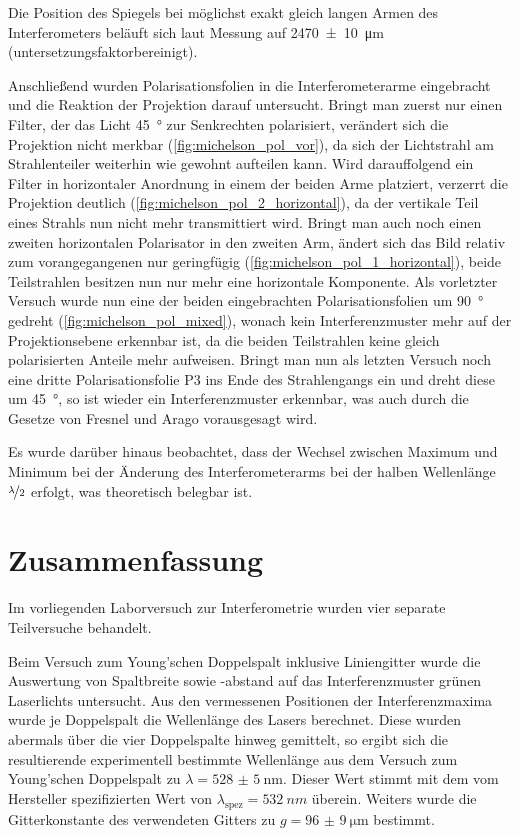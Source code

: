 \documentclass[ngerman]{scrartcl}
\begin{document}
Die Position des Spiegels bei möglichst exakt gleich langen Armen des Interferometers beläuft sich laut Messung auf \SI{2470(10)}{\micro\meter} (untersetzungsfaktorbereinigt).

Anschließend wurden Polarisationsfolien in die Interferometerarme eingebracht und die Reaktion der Projektion darauf untersucht. Bringt man zuerst nur einen Filter, der das Licht \SI{45}{\degree} zur Senkrechten polarisiert, verändert sich die Projektion nicht merkbar (\autoref{fig:michelson_pol_vor}), da sich der Lichtstrahl am Strahlenteiler weiterhin wie gewohnt aufteilen kann. Wird darauffolgend ein Filter in horizontaler Anordnung in einem der beiden Arme platziert, verzerrt die Projektion deutlich (\autoref{fig:michelson_pol_2_horizontal}), da der vertikale Teil eines Strahls nun nicht mehr transmittiert wird. Bringt man auch noch einen zweiten horizontalen Polarisator in den zweiten Arm, ändert sich das Bild relativ zum vorangegangenen nur geringfügig (\autoref{fig:michelson_pol_1_horizontal}), beide Teilstrahlen besitzen nun nur mehr eine horizontale Komponente. Als vorletzter Versuch wurde nun eine der beiden eingebrachten Polarisationsfolien um \SI{90}{\degree} gedreht (\autoref{fig:michelson_pol_mixed}), wonach kein Interferenzmuster mehr auf der Projektionsebene erkennbar ist, da die beiden Teilstrahlen keine gleich polarisierten Anteile mehr aufweisen. Bringt man nun als letzten Versuch noch eine dritte Polarisationsfolie P3 ins Ende des Strahlengangs ein und dreht diese um \SI{45}{\degree}, so ist wieder ein Interferenzmuster erkennbar, was auch durch die Gesetze von Fresnel und Arago vorausgesagt wird.

Es wurde darüber hinaus beobachtet, dass der Wechsel zwischen Maximum und Minimum bei der Änderung des Interferometerarms bei der halben Wellenlänge $\nicefrac{\lambda}{2}$ erfolgt, was theoretisch belegbar ist.



\section{Zusammenfassung}
\label{sec:zusammenfassung}

Im vorliegenden Laborversuch zur Interferometrie wurden vier separate Teilversuche behandelt.

Beim Versuch zum Young'schen Doppelspalt inklusive Liniengitter wurde die Auswertung von Spaltbreite sowie -abstand auf das Interferenzmuster grünen Laserlichts untersucht. Aus den vermessenen Positionen der Interferenzmaxima wurde je Doppelspalt die Wellenlänge des Lasers berechnet. Diese wurden abermals über die vier Doppelspalte hinweg gemittelt, so ergibt sich die resultierende experimentell bestimmte Wellenlänge aus dem Versuch zum Young'schen Doppelspalt zu \(\lambda = \SI{528(5)}{\nano\meter}\). Dieser Wert stimmt mit dem vom Hersteller spezifizierten Wert von $\lambda_{\text{spez}}=\SI{532}{nm}$ überein. Weiters wurde die Gitterkonstante des verwendeten Gitters zu \(g = \SI{96(9)}{\micro\meter}\) bestimmt.
\end{document}
